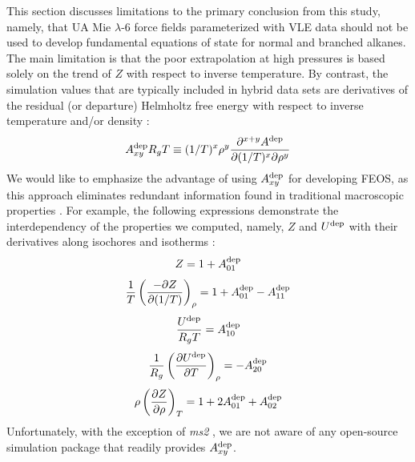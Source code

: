 \documentclass[preprint,letterpaper,floatfix,citeautoscript,aip,jcp]{revtex4-1}
\begin{document}
This section discusses limitations to the primary conclusion from this study, namely, that UA Mie $\lambda$-6 force fields parameterized with VLE data should not be used to develop fundamental equations of state for normal and branched alkanes. The main limitation is that the poor extrapolation at high pressures is based solely on the trend of $Z$ with respect to inverse temperature. By contrast, the simulation values that are typically included in hybrid data sets are derivatives of the residual (or departure) Helmholtz free energy with respect to inverse temperature and/or density \cite{Thol2016_siloxane_first,Thol2016_siloxane,Thol2017,Rutkai2013,Thol2015}:
\begin{equation} \label{Residual Derivatives}
A_{xy}^{\rm dep} R_gT \equiv (1/T)^x\rho^y \frac{\partial^{x+y}A^{\rm dep}}{\partial(1/T)^x \partial \rho^y}
\end{equation}
We would like to emphasize the advantage of using $A_{xy}^{\rm dep}$ for developing FEOS, as this approach eliminates redundant information found in traditional macroscopic properties \cite{Thol2016_LJ,Rutkai2017,Lustig2015,Rutkai2013,Rutkai2015}. For example, the following expressions demonstrate the interdependency of the properties we computed, namely, $Z$ and $U^{\rm dep}$ with their derivatives along isochores and isotherms \cite{Rutkai2015}:
\begin{equation} \label{eq:Z}
Z = 1 + A_{01}^{\rm dep}
\end{equation}
\begin{equation} \label{eq:Z_IC}
\frac{1}{T} \left(\frac{-\partial Z}{\partial(1/T)}\right)_\rho = 1 + A_{01}^{\rm dep} - A_{11}^{\rm dep}
\end{equation}
\begin{equation} \label{eq:U}
\frac{U^{\rm dep}}{R_gT} = A_{10}^{\rm dep}
\end{equation}
\begin{equation} \label{eq:U_IC}
\frac{1}{R_g} \left(\frac{\partial U^{\rm dep}}{\partial T}\right)_\rho = -A_{20}^{\rm dep} 
\end{equation} 
\begin{equation} \label{eq:Z_IT}
\rho \left(\frac{\partial Z}{\partial \rho}\right)_T = 1 + 2 A_{01}^{\rm dep} + A_{02}^{\rm dep} 
\end{equation}
Unfortunately, with the exception of \textit{ms2} \cite{ms2}, we are not aware of any open-source simulation package that readily provides $A_{xy}^{\rm dep}$. 
\end{document}
